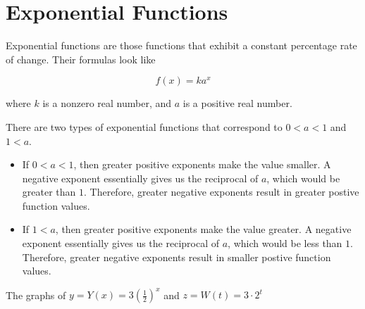\documentclass{ximera}
\begin{document}
\section{Exponential Functions}


\begin{definition}

Exponential functions are those functions that exhibit a constant percentage rate of change.  Their formulas look like


\[      f(x) = k a^x   \]

where $k$ is a nonzero real number, and $a$ is a positive real number.


\end{definition}


There are two types of exponential functions that correspond to $0<a<1$ and $1<a$.






\begin{itemize}
\item If $0<a<1$, then greater positive exponents make the value smaller.   A negative exponent essentially gives us the reciprocal of $a$, which would be greater than $1$.  Therefore, greater negative exponents result in greater postive function values.
\item If $1<a$, then greater positive exponents make the value greater.   A negative exponent essentially gives us the reciprocal of $a$, which would be less than $1$.  Therefore, greater negative exponents result in smaller postive function values.
\end{itemize}



The graphs of $y = Y(x) = 3 \left(\frac{1}{2}\right)^x$ and $z = W(t) = 3 \cdot 2^t$
\end{document}

